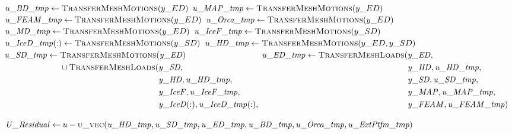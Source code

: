 \documentclass[10pt,letterpaper,oneside,notitlepage]{article}
\begin{document}
\begin{algorithmic}[1]
      \State$\mathit{u\_BD\_tmp}      \gets \Call{TransferMeshMotions}{y\_ED}$
      \State$\mathit{u\_MAP\_tmp}     \gets \Call{TransferMeshMotions}{y\_ED}$
      \State$\mathit{u\_FEAM\_tmp}    \gets \Call{TransferMeshMotions}{y\_ED}$
      \State$\mathit{u\_Orca\_tmp}    \gets \Call{TransferMeshMotions}{y\_ED}$
      \State$\mathit{u\_MD\_tmp}      \gets \Call{TransferMeshMotions}{y\_ED}$
      \State$\mathit{u\_IceF\_tmp}    \gets \Call{TransferMeshMotions}{y\_SD}$
      \State$\mathit{u\_IceD\_tmp(:)} \gets \Call{TransferMeshMotions}{y\_SD}$
      \State$\mathit{u\_HD\_tmp}      \gets \Call{TransferMeshMotions}{y\_ED,y\_SD}$
      \State$\mathit{u\_SD\_tmp}      \gets \!
            \begin{aligned}[t]
           & \Call{TransferMeshMotions}{\mathit{y\_ED}}  \\
                & \cup \Call{TransferMeshLoads}{}(\!
                   \begin{aligned}[t] 
                        & \mathit{y\_SD},                                  \\
                        & \mathit{y\_HD},       \mathit{u\_HD\_tmp},       \\
                        & \mathit{y\_IceF},     \mathit{u\_IceF\_tmp},     \\
                        & \mathit{y\_IceD(:)},  \mathit{u\_IceD\_tmp(:)},  \\
                     \end{aligned}
         \end{aligned}$
      \State$\mathit{u\_ED\_tmp} \gets \Call{TransferMeshLoads}{}( \!
                 \begin{aligned}[t]   & \mathit{y\_ED}, \\
                                      & \mathit{y\_HD},  \mathit{u\_HD\_tmp},  \\
                                      & \mathit{y\_SD},  \mathit{u\_SD\_tmp},  \\  
                                      & \mathit{y\_MAP}, \mathit{u\_MAP\_tmp}, \\ 
                                      & \mathit{y\_FEAM},\mathit{u\_FEAM\_tmp} )
                     \end{aligned}$

      \State
      \State$\mathit{U\_Residual} \gets u - \Call{u\_vec}{\mathit{u\_HD\_tmp},\mathit{u\_SD\_tmp},\mathit{u\_ED\_tmp},\mathit{u\_BD\_tmp},\mathit{u\_Orca\_tmp},\mathit{u\_ExtPtfm\_tmp}}$
      \State
      

\end{algorithmic}
\end{document}
